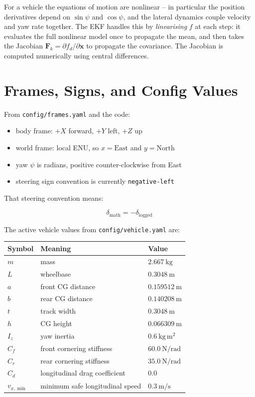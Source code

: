 \documentclass[11pt]{article}
\newcommand{\vect}[1]{\boldsymbol{#1}}
\newcommand{\mat}[1]{\mathbf{#1}}
\begin{document}
For a vehicle the equations of motion are nonlinear -- in particular the
position derivatives depend on $\sin\psi$ and $\cos\psi$, and the lateral
dynamics couple velocity and yaw rate together.  The EKF handles this by
\emph{linearising} $f$ at each step: it evaluates the full nonlinear model
once to propagate the mean, and then takes the Jacobian $\mat{F}_k = \partial
f_d / \partial \vect{x}$ to propagate the covariance.  The Jacobian is
computed numerically using central differences.

\section{Frames, Signs, and Config Values}

From \texttt{config/frames.yaml} and the code:

\begin{itemize}
    \item body frame: $+X$ forward, $+Y$ left, $+Z$ up
    \item world frame: local ENU, so $x = \text{East}$ and $y = \text{North}$
    \item yaw $\psi$ is radians, positive counter-clockwise from East
    \item steering sign convention is currently \texttt{negative-left}
\end{itemize}

That steering convention means:

\begin{equation}
\delta_{\text{math}} = -\delta_{\text{logged}}
\end{equation}

The active vehicle values from \texttt{config/vehicle.yaml} are:

\begin{center}
\begin{tabular}{lll}
\toprule
Symbol & Meaning & Value \\
\midrule
$m$ & mass & $2.667~\text{kg}$ \\
$L$ & wheelbase & $0.3048~\text{m}$ \\
$a$ & front CG distance & $0.159512~\text{m}$ \\
$b$ & rear CG distance & $0.140208~\text{m}$ \\
$t$ & track width & $0.3048~\text{m}$ \\
$h$ & CG height & $0.066309~\text{m}$ \\
$I_z$ & yaw inertia & $0.6~\text{kg}\,\text{m}^2$ \\
$C_f$ & front cornering stiffness & $60.0~\text{N/rad}$ \\
$C_r$ & rear cornering stiffness & $35.0~\text{N/rad}$ \\
$C_d$ & longitudinal drag coefficient & $0.0$ \\
$v_{x,\min}$ & minimum safe longitudinal speed & $0.3~\text{m/s}$ \\
\bottomrule
\end{tabular}
\end{center}
\end{document}
